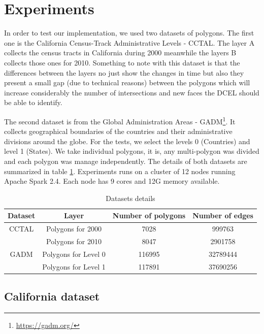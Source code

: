 \section{Experiments}

In order to test our implementation, we used two datasets of polygons.  The first one is the California Census-Track Administrative Levels - CCTAL. The layer A collects the census tracts in California during 2000 meanwhile the layers B collects those ones for 2010.  Something to note with this dataset is that the differences between the layers no just show the changes in time but also they present a small gap (due to technical reasons) between the polygons which will increase considerably the number of intersections and new faces the DCEL should be able to identify.

The second dataset is from the Global Administration Areas - GADM\footnote{\url{https://gadm.org/}}. It collects geographical boundaries of the countries and their administrative divisions around the globe.  For the tests, we select the levels 0 (Countries) and level 1 (States). We take individual polygons, it is, any multi-polygon was divided and each polygon was manage independently. The details of both datasets are summarized in table \ref{tab:datasets}.  Experiments runs on a cluster of 12 nodes running Apache Spark 2.4.  Each node has 9 cores and 12G memory available.

\begin{table}[!ht]
    \renewcommand{\arraystretch}{1.3}
    \caption{Datasets details}
    \label{tab:datasets}
    \centering
    \begin{tabular}{c c c c}
    \hline
        Dataset & Layer & Number of polygons & Number of edges \\
    \hline
        CCTAL & Polygons for 2000 & 7028 & 999763  \\
              & Polygons for 2010 & 8047 & 2901758 \\
        GADM  & Polygons for Level 0 & 116995 & 32789444 \\
              & Polygons for Level 1 & 117891 & 37690256 \\
    \hline
    \end{tabular}
\end{table}

\subsection{California dataset}

